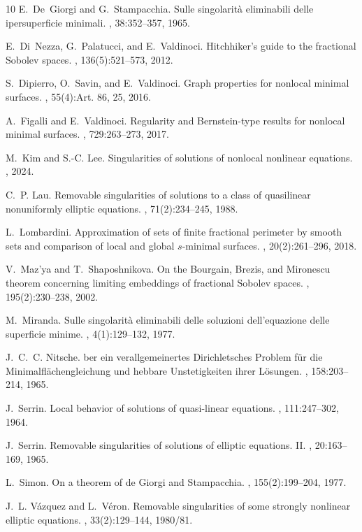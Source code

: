 \documentclass{amsart}
\theoremstyle{plain}
\theoremstyle{definition}
\numberwithin{equation}{section}
\begin{document}
\begin{thebibliography}{10}
E.~De~Giorgi and G.~Stampacchia.
\newblock Sulle singolarit\`a{} eliminabili delle ipersuperficie minimali.
,
  38:352--357, 1965.

E.~Di~Nezza, G.~Palatucci, and E.~Valdinoci.
\newblock Hitchhiker's guide to the fractional {S}obolev spaces.
, 136(5):521--573, 2012.

S.~Dipierro, O.~Savin, and E.~Valdinoci.
\newblock Graph properties for nonlocal minimal surfaces.
, 55(4):Art. 86, 25,
  2016.

A.~Figalli and E.~Valdinoci.
\newblock Regularity and {B}ernstein-type results for nonlocal minimal
  surfaces.
, 729:263--273, 2017.

M.~Kim and S.-C. Lee.
\newblock Singularities of solutions of nonlocal nonlinear equations.
, 2024.

C.~P. Lau.
\newblock Removable singularities of solutions to a class of quasilinear
  nonuniformly elliptic equations.
, 71(2):234--245, 1988.

L.~Lombardini.
\newblock Approximation of sets of finite fractional perimeter by smooth sets
  and comparison of local and global {$s$}-minimal surfaces.
, 20(2):261--296, 2018.

V.~Maz'ya and T.~Shaposhnikova.
\newblock On the {B}ourgain, {B}rezis, and {M}ironescu theorem concerning
  limiting embeddings of fractional {S}obolev spaces.
, 195(2):230--238, 2002.

M.~Miranda.
\newblock Sulle singolarit\`a{} eliminabili delle soluzioni dell'equazione
  delle superficie minime.
, 4(1):129--132, 1977.

J.~C.~C. Nitsche.
ber ein verallgemeinertes {D}irichletsches {P}roblem f\"ur die
  {M}inimalfl\"achengleichung und hebbare {U}nstetigkeiten ihrer {L}\"osungen.
, 158:203--214, 1965.

J.~Serrin.
\newblock Local behavior of solutions of quasi-linear equations.
, 111:247--302, 1964.

J.~Serrin.
\newblock Removable singularities of solutions of elliptic equations. {II}.
, 20:163--169, 1965.

L.~Simon.
\newblock On a theorem of de {G}iorgi and {S}tampacchia.
, 155(2):199--204, 1977.

J.~L. V\'azquez and L.~V\'eron.
\newblock Removable singularities of some strongly nonlinear elliptic
  equations.
, 33(2):129--144, 1980/81.

\end{thebibliography}
\end{document}
